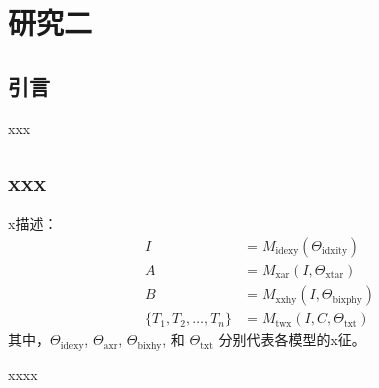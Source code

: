 
\chapter{研究二}\label{ch-name2}
\section{引言}
xxx

\section{xxx}\label{sec-x x}
x描述：
\begin{equation}\begin{aligned}
	I &= M_{\text{idexy}}(\Theta_{\text{idxity}}) \\
	A &= M_{\text{xar}}(I, \Theta_{\text{xtar}}) \\
	B &= M_{\text{xxhy}}(I, \Theta_{\text{bixphy}}) \\
	\{T_1, T_2, \ldots, T_n\} &= M_{\text{twx}}(I, C, \Theta_{\text{txt}})
\end{aligned}\end{equation}
其中，\(\Theta_{\text{idexy}}\), \(\Theta_{\text{axr}}\), \(\Theta_{\text{bixhy}}\), 和 \(\Theta_{\text{txt}}\) 分别代表各模型的x征。


xxxx

